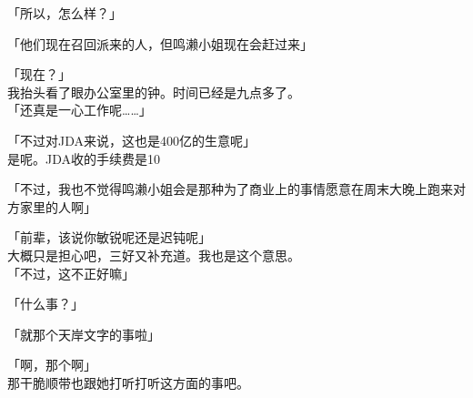 「所以，怎么样？」

「他们现在召回派来的人，但鸣濑小姐现在会赶过来」

「现在？」\\

我抬头看了眼办公室里的钟。时间已经是九点多了。\\

「还真是一心工作呢……」

「不过对JDA来说，这也是400亿的生意呢」\\

是呢。JDA收的手续费是10%

「不过，我也不觉得鸣濑小姐会是那种为了商业上的事情愿意在周末大晚上跑来对方家里的人啊」

「前辈，该说你敏锐呢还是迟钝呢」\\

大概只是担心吧，三好又补充道。我也是这个意思。\\

「不过，这不正好嘛」

「什么事？」

「就那个天岸文字的事啦」

「啊，那个啊」\\

那干脆顺带也跟她打听打听这方面的事吧。\\

